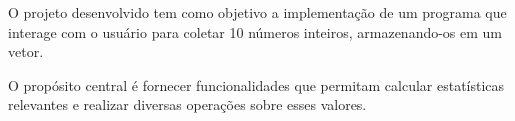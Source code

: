 O projeto desenvolvido tem como objetivo a implementação de um programa que interage com o usuário para coletar 10 números inteiros, armazenando-\/os em um vetor.

O propósito central é fornecer funcionalidades que permitam calcular estatísticas relevantes e realizar diversas operações sobre esses valores. 
